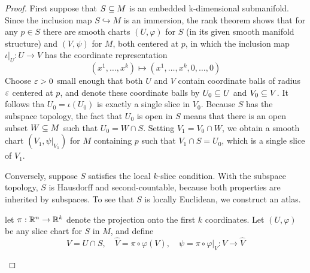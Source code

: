 \begin{proof}
First suppose that $S\subseteq M$ is an embedded k-dimensional submanifold. Since the inclusion map $S\hookrightarrow M$ is an immersion, the rank theorem shows that for any $p\in S$ there are smooth charts $(U,\varphi)$ for $S$ (in its given smooth manifold structure) and $(V,\psi)$ for $M$, both centered at $p$, in which the inclusion map $\iota|_U:U\to V$ has the coordinate representation
\[(x^1,\dots,x^k)\mapsto(x^1,\dots,x^k,0,\dots,0)\]
Choose $\varepsilon>0$ small enough that both $U$ and $V$ contain coordinate balls of radius $\varepsilon$ centered at $p$, and denote these coordinate balls by $U_0\subseteq U$ and $V_0\subseteq V$. It follows tha $U_0=\iota(U_0)$ is exactly a single slice in $V_0$. Because $S$ has the subspace topology, the fact that $U_0$ is open in $S$ means that there is an open subset $W\subseteq M$ such that $U_0=W\cap S$. Setting $V_1=V_0\cap W$, we obtain a smooth chart $(V_1,\psi|_{V_1})$ for $M$ containing $p$ such that $V_1\cap S=U_0$, which is a single slice of $V_1$.\par
Conversely, suppose $S$ satisfies the local $k$-slice condition. With the subspace topology, $S$ is Hausdorff and second-countable, because both properties are inherited by subspaces. To see that $S$ is locally Euclidean, we construct an atlas.\par
let $\pi:\mathbb{R}^n\to\mathbb{R}^k$ denote the projection onto the first $k$ coordinates. Let $(U,\varphi)$ be any slice chart for $S$ in $M$, and define
\[V=U\cap S,\quad\widehat{V}=\pi\circ\varphi(V),\quad \psi=\pi\circ\varphi|_V:V\to\widehat{V}\]
\begin{figure}[h]
\centering

\end{figure}
\end{proof}
